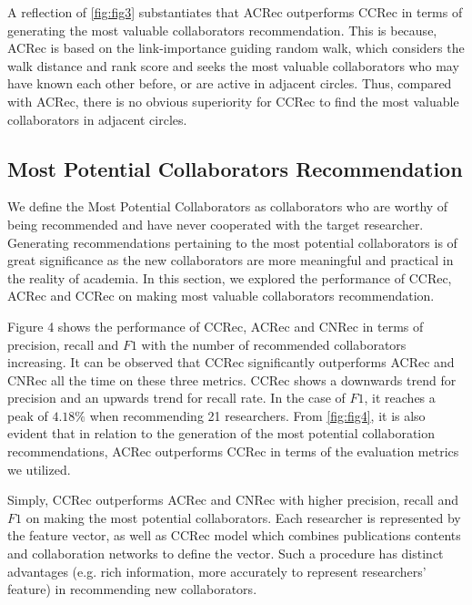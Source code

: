 A reflection of \autoref{fig:fig3} substantiates that ACRec outperforms CCRec in terms of generating the most valuable collaborators recommendation. This is because, ACRec is based on the link-importance guiding random walk, which considers the walk distance and rank score and seeks the most valuable collaborators who may have known each other before, or are active in adjacent circles. Thus, compared with ACRec, there is no obvious superiority for CCRec to find the most valuable collaborators in adjacent circles.

\subsection*{Most Potential Collaborators Recommendation}
We define the Most Potential Collaborators as collaborators who are worthy of being recommended and have never cooperated with the target researcher. Generating recommendations pertaining to the most potential collaborators is of great significance as the new collaborators are more meaningful and practical in the reality of academia. In this section, we explored the performance of CCRec, ACRec and CCRec on making most valuable collaborators recommendation.

Figure 4 shows the performance of CCRec, ACRec and CNRec in terms of precision, recall and $F1$ with the number of recommended collaborators increasing. It can be observed that CCRec significantly outperforms ACRec and CNRec all the time on these three metrics. CCRec shows a downwards trend for precision and an upwards trend for recall rate. In the case of $F1$, it reaches a peak of $4.18\%$ when recommending 21 researchers. From \autoref{fig:fig4}, it is also evident that in relation to the generation of the most potential collaboration recommendations, ACRec outperforms CCRec in terms of the evaluation metrics we utilized.

Simply, CCRec outperforms ACRec and CNRec with higher precision, recall and $F1$ on making the most potential collaborators. Each researcher is represented by the feature vector, as well as CCRec model which combines publications contents and collaboration networks to define the vector. Such a procedure has distinct advantages (e.g. rich information, more accurately to represent researchers' feature) in recommending new collaborators.

